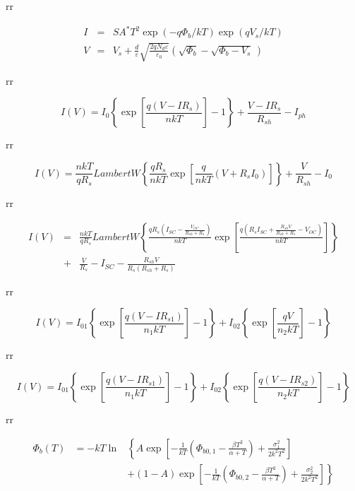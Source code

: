 \documentclass[14pt]{article}
\numberwithin{equation}{part}
\begin{document}
rr

\begin{eqnarray*}
  I& =& SA^*T^2\exp(-q\Phi_b/kT)\exp(qV_s/kT) \\
  V&=& V_s +\frac{d}{\varepsilon}\sqrt{\frac{2qN_d\varepsilon}{\varepsilon_0}}
       \left(\sqrt{\Phi_b}-\sqrt{\Phi_b-V_s}\,\right)
\end{eqnarray*}

rr

\begin{equation*}
    I(V)=I_0\left\{\exp \left[\frac{q(V-IR_s)}{nkT}\right]-1\right\}+\frac{V-IR_s}{R_{sh}}-I_{ph}
\end{equation*}

rr

\begin{equation*}
    I(V)=\frac{nkT}{qR_s}LambertW\left\{\frac{qR_s}{nkT}
      \exp\left[\frac{q}{nkT}(V+R_sI_0)\right]  \right\}+\frac{V}{R_{sh}}-I_0
\end{equation*}

rr

\begin{eqnarray*}
  I(V)&=& \frac{nkT}{qR_s} LambertW\left\{\frac{qR_s\left(I_{SC}-\frac{V_{OC}}{R_{sh}+R_s}\right)}{nkT}
      \exp\left[\frac{q\left(R_sI_{SC}+\frac{R_{sh}V}{R_{sh}+R_s}-V_{OC}\right)}{nkT}\right]\right\}\\
   &+& \frac{V}{R_s}-I_{SC}-\frac{R_{sh}V}{R_s(R_{sh}+R_s)}
\end{eqnarray*}

rr

\begin{equation*}
    I(V)=I_{01}\left\{\exp \left[\frac{q(V-IR_{s1})}{n_1kT}\right]-1\right\}+
         I_{02}\left\{\exp \left[\frac{qV}{n_2kT}\right]-1\right\}
\end{equation*}

rr

\begin{equation*}
    I(V)=I_{01}\left\{\exp \left[\frac{q(V-IR_{s1})}{n_1kT}\right]-1\right\}+
         I_{02}\left\{\exp \left[\frac{q(V-IR_{s2})}{n_2kT}\right]-1\right\}
\end{equation*}

rr

\begin{eqnarray*}
  \Phi_b(T)&= -kT\ln &\left\{A\exp\left[-\frac{1}{kT}\left(\Phi_{b0,1}-\frac{\beta T^2}{\alpha+T}\right)+\frac{\sigma_1^2}{2k^2T^2}\right]\right. \\
   &&+ \left.(1-A)\exp\left[-\frac{1}{kT}\left(\Phi_{b0,2}-\frac{\beta T^2}{\alpha+T}\right)+\frac{\sigma_2^2}{2k^2T^2}\right]\right\}
\end{eqnarray*}
\end{document}
